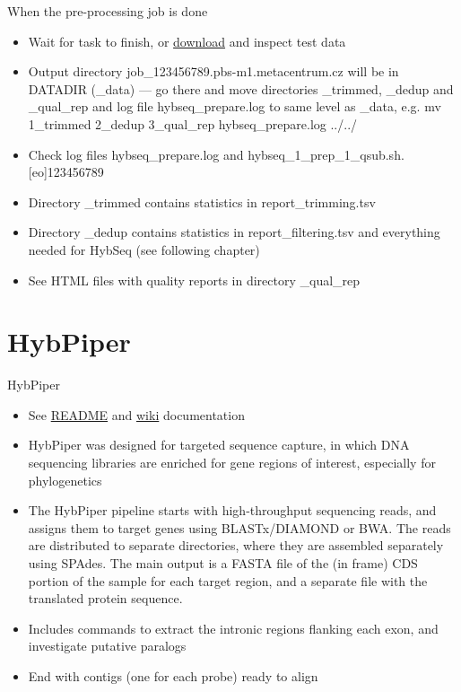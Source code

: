 \documentclass[compress,  xelatex, 11pt, xcolor=x11names, aspectratio=169,
	hyperref={
		bookmarks=true,
		unicode=true,
		colorlinks=true,
		pdftitle={HybSeq course},
		plainpages=false,
		pdfauthor={Vojtech Zeisek},
		pdfsubject={Practical processing of HybSeq target enrichment sequencing data on computing grids like MetaCentrum},
		pdfcreator={XeLaTeX},
		pdfkeywords={BASH, command line, GNU, HybSeq, Linux, MetaCentrum, sequencing shell, target enrichment},
		linkcolor=Turquoise4, %
		anchorcolor=DodgerBlue4, %
		citecolor=DodgerBlue4, %
		filecolor=DodgerBlue4, %
		menucolor=Tan4, %
		urlcolor=DarkOliveGreen4 %
		},
	url={hyphens, lowtilde} %
	]{beamer}
\renewcommand{\texttt}[1]{\colorbox{Cornsilk2}{{\ttfamily #1}}}
\begin{document}
\begin{frame}{When the pre-processing job is done}
	\begin{itemize}
		\item Wait for task to finish, or \href{https://botany.natur.cuni.cz/zeisek/hybseq_course_zingibers_1_prepared.zip}{download} and inspect test data
		\item Output directory \texttt{job\_123456789.pbs-m1.metacentrum.cz} will be in \texttt{DATADIR} (\texttt{0\_data}) --- go there and move directories \texttt{1\_trimmed}, \texttt{2\_dedup} and \texttt{3\_qual\_rep} and log file \texttt{hybseq\_prepare.log} to same level as \texttt{0\_data}, e.g. \texttt{mv 1\_trimmed 2\_dedup 3\_qual\_rep hybseq\_prepare.log ../../}
		\item Check log files \texttt{hybseq\_prepare.log} and \texttt{hybseq\_1\_prep\_1\_qsub.sh.[eo]123456789}
		\item Directory \texttt{1\_trimmed} contains statistics in \texttt{report\_trimming.tsv}
		\item Directory \texttt{2\_dedup} contains statistics in \texttt{report\_filtering.tsv} and everything needed for HybSeq (see following chapter)
		\item See HTML files with quality reports in directory \texttt{3\_qual\_rep}
	\end{itemize}
\end{frame}

\section{HybPiper}

\begin{frame}{HybPiper}
	\begin{itemize}
		\item See \href{https://github.com/mossmatters/HybPiper\#readme}{README} and \href{https://github.com/mossmatters/HybPiper/wiki}{wiki} documentation
		\item HybPiper was designed for targeted sequence capture, in which DNA sequencing libraries are enriched for gene regions of interest, especially for phylogenetics
		\item The HybPiper pipeline starts with high-throughput sequencing reads, and assigns them to target genes using BLASTx/DIAMOND or BWA. The reads are distributed to separate directories, where they are assembled separately using SPAdes. The main output is a FASTA file of the (in frame) CDS portion of the sample for each target region, and a separate file with the translated protein sequence.
		\item Includes commands to extract the intronic regions flanking each exon, and investigate putative paralogs
		\item End with contigs (one for each probe) ready to align
	\end{itemize}
\end{frame}
\end{document}
